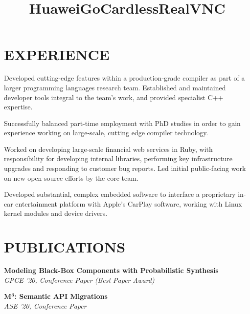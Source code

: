 \documentclass[margin]{res}
\begin{document}
\begin{resume}
\section{EXPERIENCE}

\dates{}
\title{\textbf{Huawei}}
\begin{position}
Developed cutting-edge features within a production-grade compiler as part of a
larger programming languages research team. Established and maintained developer
tools integral to the team's work, and provided specialist C++ expertise.

Successfully balanced part-time employment with PhD studies in order to gain
experience working on large-scale, cutting edge compiler technology.
\end{position}

\dates{}
\title{\textbf{GoCardless}}
\begin{position}
Worked on developing large-scale financial web services in Ruby, with
responsibility for developing internal libraries, performing key infrastructure
upgrades and responding to customer bug reports. Led initial public-facing work
on new open-source efforts by the core team.
\end{position}

\dates{}
\title{\textbf{RealVNC}}
\begin{position}
Developed substantial, complex embedded software to interface a proprietary
in-car entertainment platform with Apple's CarPlay software, working with Linux
kernel modules and device drivers.
\end{position}

\clearpage

\section{PUBLICATIONS}

\par
\textbf{Modeling Black-Box Components with Probabilistic Synthesis}\\
\emph{GPCE '20, Conference Paper (Best Paper Award)}

\par
\textbf{M$^\mathbf{3}$: Semantic API Migrations}\\
\emph{ASE '20, Conference Paper}


\end{resume}
\end{document}
